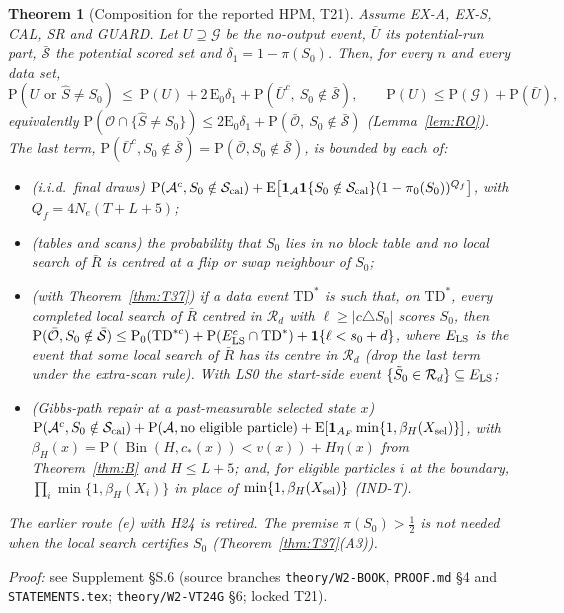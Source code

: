 \documentclass[11pt]{article}
\newtheorem{theorem}{Theorem}
\theoremstyle{definition}
\theoremstyle{remark}
\renewcommand{\Pr}{\mathrm{P}}
\newcommand{\E}{\mathrm{E}}
\newcommand{\Sz}{S_0}
\newcommand{\Sh}{\widehat S}
\newcommand{\cA}{\mathcal A}
\newcommand{\cS}{\mathcal S}
\newcommand{\cO}{\mathcal O}
\newcommand{\cG}{\mathcal G}
\newcommand{\cR}{\mathcal R}
\newcommand{\Ind}{\mathbf 1}
\DeclareMathOperator{\Bin}{Bin}
\begin{document}
\begin{theorem}[Composition for the reported HPM, T21]\label{thm:T21}
Assume EX-A, EX-S, CAL, SR and GUARD. Let $U\supseteq\cG$ be the no-output event, $\bar U$ its potential-run part, $\bar{\cS}$ the potential scored set and
$\delta_1=1-\pi(\Sz)$. Then, for \emph{every} $n$ and every data set,
\[
\Pr(U\text{ or }\Sh\ne\Sz)\ \le\ \Pr(U)+2\,\E_0\delta_1+\Pr(\bar U^c,\ \Sz\notin\bar{\cS}),\qquad \Pr(U)\le\Pr(\cG)+\Pr(\bar U),
\]
equivalently $\Pr(\cO\cap\{\Sh\ne\Sz\})\le2\E_0\delta_1+\Pr(\bar{\cO},\ \Sz\notin\bar{\cS})$ (Lemma~\ref{lem:RO}). The last term, $\Pr(\bar U^c,\Sz\notin\bar{\cS})=\Pr(\bar{\cO},\Sz\notin\bar{\cS})$, is bounded by each of:
\begin{itemize}
\item[(a)] (i.i.d.\ final draws) $\Pr(\cA^c,\Sz\notin\cS_{\rm cal})+\E\big[\Ind_{\cA}\Ind\{\Sz\notin\cS_{\rm cal}\}(1-\pi_0(\Sz))^{Q_f}\big]$, with $Q_f=4N_e(T+L+5)$;
\item[(d)] (tables and scans) the probability that $\Sz$ lies in no block table and no local search of $\bar R$ is centred at a flip or swap neighbour of $\Sz$;
\item[(d$^+$)] (with Theorem~\ref{thm:T37}) if a data event $\mathrm{TD}^*$ is such that, on $\mathrm{TD}^*$, every completed local search of $\bar R$ centred in $\cR_d$ with $\ell\ge|c\triangle\Sz|$ scores $\Sz$,
then $\Pr(\bar{\cO},\Sz\notin\bar{\cS})\le\Pr_0(\mathrm{TD}^{*c})+\Pr(E_{\rm LS}^c\cap\mathrm{TD}^*)+\Ind\{\ell<s_0+d\}$, where $E_{\rm LS}$ is the event that some local search of $\bar R$ has its centre in $\cR_d$ (drop the last term under the extra-scan rule). With LS0 the start-side event $\{\tilde S_0\in\cR_d\}\subseteq E_{\rm LS}$;
\item[(e$'$)] (Gibbs-path repair at a past-measurable selected state $x$) $\Pr(\cA^c,\Sz\notin\cS_{\rm cal})+\Pr(\cA,\text{no eligible particle})+\E[\Ind_{A_F}\min\{1,\beta_H(X_{\rm sel})\}]$, with
$\beta_H(x)=\Pr(\Bin(H,c_*(x))<v(x))+H\eta(x)$ from Theorem~\ref{thm:B} and $H\le L+5$; and, for eligible particles $i$ at the boundary, $\prod_i\min\{1,\beta_H(X_i)\}$ in place of $\min\{1,\beta_H(X_{\rm sel})\}$ (IND-T).
\end{itemize}
The earlier route (e) with H24 is retired. The premise $\pi(\Sz)>\tfrac12$ is not needed when the local search certifies $\Sz$ (Theorem~\ref{thm:T37}(A3)).
\end{theorem}
\noindent\emph{Proof:} see Supplement \S S.6 (source branches \texttt{theory/W2-BOOK}, \texttt{PROOF.md} \S4 and \texttt{STATEMENTS.tex}; \texttt{theory/W2-VT24G} \S6; locked T21).
\end{document}
